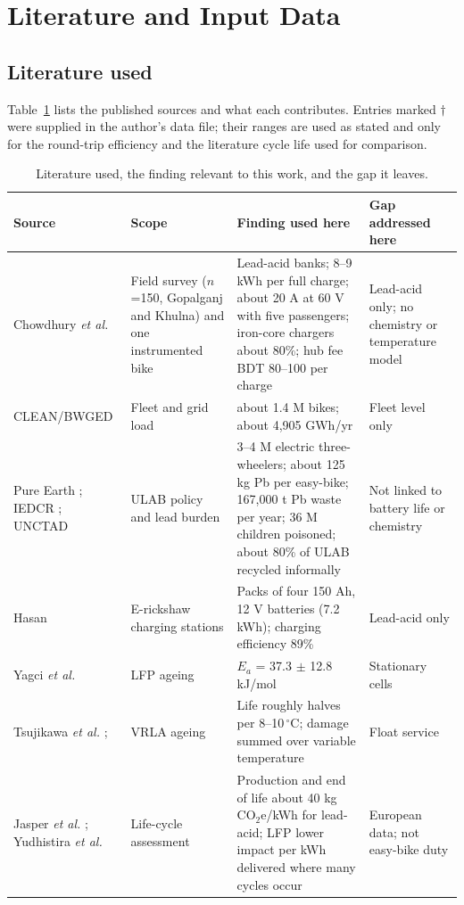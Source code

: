 \section{Literature and Input Data}
\label{sec:data}
\subsection{Literature used}
Table~\ref{tab:lit} lists the published sources and what each contributes. Entries marked $\dagger$ were supplied in the author's data file; their ranges are used as stated and only for the round-trip efficiency and the literature cycle life used for comparison.
\begin{table}[t]
\caption{Literature used, the finding relevant to this work, and the gap it leaves.}
\label{tab:lit}
\centering\footnotesize
\renewcommand{\arraystretch}{1.1}
\begin{tabular}{p{2.6cm}p{3.0cm}p{6.0cm}p{2.8cm}}
\hline
Source & Scope & Finding used here & Gap addressed here \\
\hline
Chowdhury \emph{et al.} \cite{chowdhury2026} & Field survey ($n$=150, Gopalganj and Khulna) and one instrumented bike & Lead-acid banks; 8--9 kWh per full charge; about 20 A at 60 V with five passengers; iron-core chargers about 80\%; hub fee BDT 80--100 per charge & Lead-acid only; no chemistry or temperature model \\
CLEAN/BWGED \cite{clean2024} & Fleet and grid load & about 1.4 M bikes; about 4{,}905 GWh/yr & Fleet level only \\
Pure Earth \cite{pureearth_smep,fe2024}; IEDCR \cite{das2026}; UNCTAD \cite{unctad_smep} & ULAB policy and lead burden & 3--4 M electric three-wheelers; about 125 kg Pb per easy-bike; 167{,}000 t Pb waste per year; 36 M children poisoned; about 80\% of ULAB recycled informally & Not linked to battery life or chemistry \\
Hasan \cite{hasan2020} & E-rickshaw charging stations & Packs of four 150 Ah, 12 V batteries (7.2 kWh); charging efficiency 89\% & Lead-acid only \\
Yagci \emph{et al.} \cite{yagci2026} & LFP ageing & $E_a$ = 37.3 $\pm$ 12.8 kJ/mol & Stationary cells \\
Tsujikawa \emph{et al.} \cite{tsujikawa2009}; \cite{bu806a} & VRLA ageing & Life roughly halves per 8--10\,$^\circ$C; damage summed over variable temperature & Float service \\
Jasper \emph{et al.} \cite{jasper2025}; Yudhistira \emph{et al.} \cite{yudhistira2022} & Life-cycle assessment & Production and end of life about 40 kg CO$_2$e/kWh for lead-acid; LFP lower impact per kWh delivered where many cycles occur & European data; not easy-bike duty \\

\end{tabular}
\end{table}
